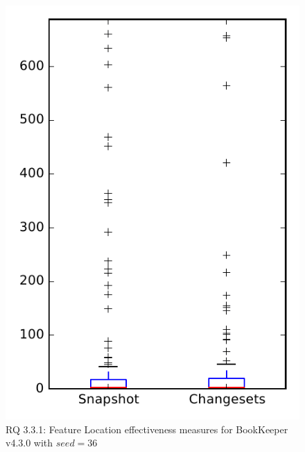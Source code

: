 
\begin{figure}
\centering
\includegraphics[height=0.4\textheight]{figures/flt_seed/rq1_bookkeeper_36}
\caption{RQ 3.3.1: Feature Location effectiveness measures for BookKeeper v4.3.0 with $seed=36$}
\label{fig:flt_seed:rq1:bookkeeper}
\end{figure}
